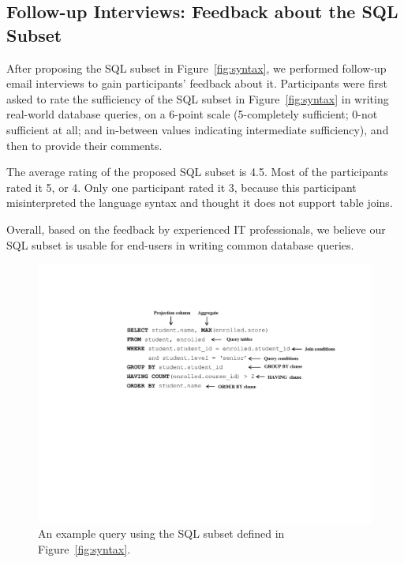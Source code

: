 





\subsection{Follow-up Interviews: Feedback about the SQL Subset}
\label{sec:interview}

After proposing the SQL subset in Figure~\ref{fig:syntax},
we performed follow-up email interviews to gain
participants' feedback about it. Participants were first asked to rate
the sufficiency of the SQL subset in Figure~\ref{fig:syntax}
in writing real-world database queries,
on a 6-point scale (5-completely
sufficient; 0-not sufficient at all;
and in-between values indicating intermediate sufficiency),
and then to provide their comments.

The average rating of the proposed SQL subset is 4.5. Most of
the participants rated it 5, or 4. Only one participant rated
it 3, because this participant misinterpreted the language
syntax and thought it does not support table joins.

Overall, based on the feedback by experienced IT professionals,
we believe our SQL subset is usable
for end-users in writing common database queries.

\begin{figure}[t]
  \centering
  \includegraphics[scale=0.55]{queryex}
  \vspace*{-5.0ex}\caption {{\label{fig:queryex}
  An example query using the SQL subset defined in Figure~\ref{fig:syntax}.
}}
\end{figure}
